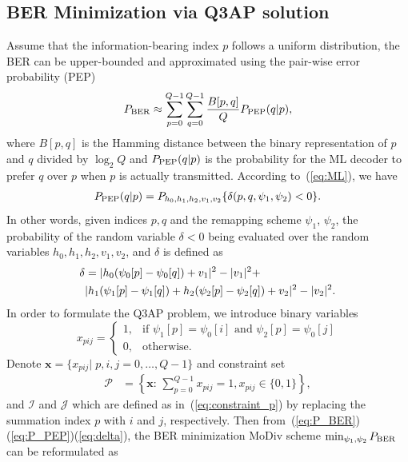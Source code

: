 \documentclass[journal]{IEEEtran}
\newcommand{\PEP}{\rm{PEP}}
\newcommand{\BER}{\rm{BER}}
\begin{document}
\subsection{BER Minimization via Q3AP solution}
Assume that the information-bearing index $p$ follows a uniform distribution,
the BER can be upper-bounded and approximated using the pair-wise error
probability (PEP)~\cite{harvind2005symbol}
\begin{align}
    P_{\BER} \approx \sum_{p=0}^{Q - 1}\sum_{q=0}^{Q - 1}\frac{B[p,
    q]}{Q}P_{\PEP}(q | p), \label{eq:P_BER}
\end{align}
where $B[p,q]$ is the Hamming distance between the binary representation of $p$
and $q$ divided by $\log_2Q$ and $P_{\PEP}(q | p)$ is the probability for the ML
decoder to prefer $q$ over $p$ when $p$ is actually transmitted. According to~(\ref{eq:ML}), we have
\begin{align}
    P_{\PEP}(q | p) = P_{h_0,h_1,h_2,v_1,v_2}\{\delta(p,q,\psi_1,\psi_2) < 0\}.
    \label{eq:P_PEP}
\end{align}
In other words, given indices $p, q$ and the remapping scheme $\psi_1$, $\psi_2$, the
probability of the random variable $\delta<0$ being evaluated over the random
variables $h_0,h_1,h_2,v_1,v_2$, and $\delta$ is defined as
\begin{align}
    \delta & = |h_0(\psi_0[p] - \psi_0[q]) + v_1|^2 - |v_1|^2 +\notag\\ 
    &
    |h_1(\psi_1[p] - \psi_1[q])+h_2(\psi_2[p] - \psi_2[q])+v_2|^2 -
    |v_2|^2.
    \label{eq:delta}
\end{align}
In order to formulate the Q3AP problem, we introduce binary variables
\[
x_{pij}= \left\{\begin{array}{ll}
1,& \mbox{if $\psi_1[p] = \psi_0[i]$ and $\psi_2[p] = \psi_0[j]$}\\
 0,& \mbox{otherwise.} \end{array} \right. \]
Denote $\mathbf{x} = \{x_{pij}|\;p,i,j=0,\ldots,Q-1\}$
and constraint set
\begin{align}
    \mathcal{P} & = \left\{\mathbf{x}:\,\sum_{p=0}^{Q-1}x_{pij} = 1,
    x_{pij}\in\{0, 1\}\right\}, \label{eq:constraint_p}
\end{align}
and $\mathcal{I}$ and $\mathcal{J}$ which are defined as
in~(\ref{eq:constraint_p}) by replacing the summation index $p$ with $i$ and
$j$, respectively. Then from~(\ref{eq:P_BER})(\ref{eq:P_PEP})(\ref{eq:delta}),
the BER minimization MoDiv scheme $\min_{\psi_1, \psi_2}P_{\BER}$ can be
reformulated as
\end{document}

